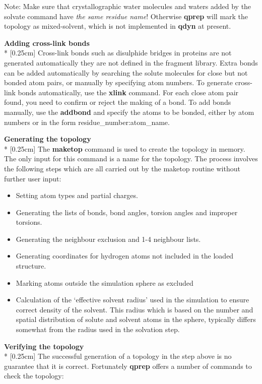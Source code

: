 \documentclass[a4paper,10pt]{article}
\begin{document}
Note: Make sure that crystallographic water molecules and waters added
by the solvate command have \textit{the same residue name}!  Otherwise
\textbf{qprep} will mark  the topology as mixed-solvent,  which is not
implemented in \textbf{qdyn} at present.

\textbf{Adding cross-link bonds}\\*
[0.25cm] Cross-link bonds  such as disulphide bridges  in proteins are
not generated automatically {\-} they  are not defined in the fragment
library.  Extra bonds  can  be added  automatically  by searching  the
solute molecules for  close but not bonded atom pairs,  or manually by
specifying atom numbers.  To  generate cross-link bonds automatically,
use the  \textbf{xlink} command. For  each close atom pair  found, you
need to confirm or reject the making of a bond. To add bonds manually,
use the \textbf{addbond} and specify the atoms to be bonded, either by
atom numbers or in the form residue{\_}number:atom{\_}name.

\textbf{Generating the topology}\\*
[0.25cm] The \textbf{maketop}  command is used to  create the topology
in  memory.  The  only input  for  this  command  is  a name  for  the
topology.  The process  involves  the following  steps  which are  all
carried out by the maketop routine without further user input:

\begin{itemize}
\item Setting atom types and partial charges.
\item Generating the lists of bonds, bond angles, torsion angles and improper torsions.
\item Generating the neighbour exclusion and 1-4 neighbour lists.
\item Generating coordinates for hydrogen atoms not included in the loaded structure.
\item Marking atoms outside the simulation sphere as excluded
\item Calculation of the `effective solvent radius' used in the
simulation to ensure correct density of the solvent. This radius
which is based on the number and spatial distribution of solute
and solvent atoms in the sphere, typically differs somewhat from
the radius used in the solvation step.
\end{itemize}

\textbf{Verifying the topology}\\*
[0.25cm] The successful generation of a  topology in the step above is
no guarantee that  it is correct. Fortunately  \textbf{qprep} offers a
number of commands to check the topology:
\end{document}

